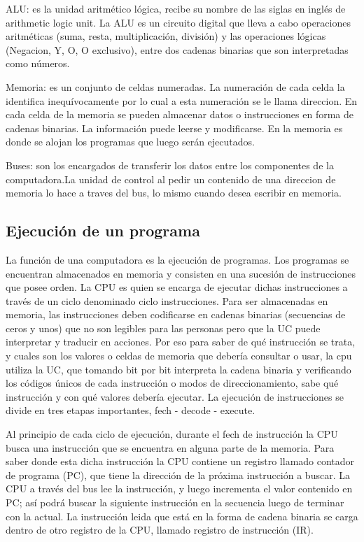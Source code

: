 ALU: es la unidad aritmético lógica, recibe su nombre de las siglas en inglés de arithmetic logic unit. La ALU es un circuito digital que lleva a cabo operaciones aritméticas (suma, resta, multiplicación, división) y las operaciones lógicas (Negacion, Y, O, O exclusivo), entre dos cadenas binarias que son interpretadas como números. 

Memoria: es un conjunto de celdas numeradas. La numeración de cada celda la identifica inequívocamente por lo cual a esta numeración se le llama direccion. En cada celda de la memoria se pueden almacenar datos o instrucciones en forma de cadenas binarias. La información puede leerse y modificarse. En la memoria es donde se alojan los programas que luego serán ejecutados.

Buses: son los encargados de transferir los datos entre los componentes de la computadora.La unidad de control al pedir un contenido de una direccion de memoria lo hace a traves del bus, lo mismo cuando desea escribir en memoria.

\subsection{Ejecución de un programa}

La función de una computadora es la ejecución de programas. Los programas se encuentran almacenados en memoria y consisten en una sucesión de instrucciones que posee orden. La CPU es quien se encarga de ejecutar dichas instrucciones a través de un ciclo denominado ciclo instrucciones. Para ser almacenadas en memoria, las instrucciones deben codificarse en cadenas binarias (secuencias de ceros y unos) que no son legibles para las personas pero que la UC puede interpretar y traducir en acciones. Por eso para saber de qué instrucción se trata, y cuales son los valores o celdas de memoria que debería consultar o usar, la cpu utiliza la UC, que tomando bit por bit interpreta la cadena binaria y verificando los códigos únicos de cada instrucción o modos de direccionamiento, sabe qué instrucción y con qué valores debería ejecutar. La ejecución de instrucciones se divide en tres etapas importantes, fech - decode - execute.

Al principio de cada ciclo de ejecución, durante el fech de instrucción la CPU busca una instrucción que se encuentra en alguna parte de la memoria. Para saber donde esta dicha instrucción la CPU contiene un registro llamado contador de programa (PC), que tiene la dirección de la próxima instrucción a buscar. La CPU a través del bus lee la instrucción, y luego incrementa el valor contenido en PC; así podrá buscar la siguiente instrucción en la secuencia luego de terminar con la actual. La instrucción leida que está en la forma de cadena binaria se carga dentro de otro registro de la CPU, llamado registro de instrucción (IR).

